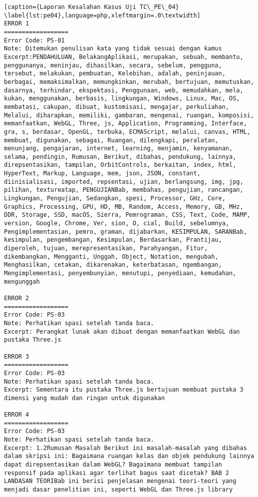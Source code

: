 \begin{enumerate}
\begin{lstlisting}[caption={Laporan Kesalahan Kasus Uji TC\_PE\_04}	\label{lst:pe04},language=php,xleftmargin=.0\textwidth]
ERROR 1
==================
Error Code: PS-01
Note: Ditemukan penulisan kata yang tidak sesuai dengan kamus
Excerpt:PENDAHULUAN, BelakangAplikasi, merupakan, sebuah, membantu, penggunanya, meninjau, dihasilkan, secara, sebelum, pengguna, tersebut, melakukan, pembuatan, Kelebihan, adalah, peninjauan, berbagai, memaksimalkan, memungkinkan, merubah, bertujuan, memutuskan, dasarnya, terhindar, ekspektasi, Penggunaan, web, memudahkan, mela, kukan, menggunakan, berbasis, lingkungan, Windows, Linux, Mac, OS, membatasi, cakupan, dibuat, kustomisasi, mengajar, perkuliahan, Melalui, diharapkan, memiliki, gambaran, mengenai, ruangan, komposisi, memanfaatkan, WebGL, Three, js, Application, Programming, Interface, gra, s, berdasar, OpenGL, terbuka, ECMAScript, melalui, canvas, HTML, membuat, digunakan, sebagai, Ruangan, dilengkapi, peralatan, menunjang, pengajaran, internet, learning, menjamin, kenyamanan, selama, pendingin, Rumusan, Berikut, dibahas, pendukung, lainnya, direpsentasikan, tampilan, OrbitControls, berkaitan, index, html, HyperText, Markup, Language, mem, json, JSON, constant, diinisialisasi, imported, repsentasi, ujian, berlangsung, img, jpg, pilihan, textureatap, PENGUJIANBab, membahas, pengujian, rancangan, Lingkungan, Pengujian, Sedangkan, spesi, Processor, GHz, Core, Graphics, Processing, GPU, HD, MB, Random, Access, Memory, GB, MHz, DDR, Storage, SSD, macOS, Sierra, Pemrograman, CSS, Text, Code, MAMP, version, Google, Chrome, Ver, sion, O, cial, Build, sebelumnya, Pengimplementasian, pemro, graman, dijabarkan, KESIMPULAN, SARANBab, kesimpulan, pengembangan, Kesimpulan, Berdasarkan, Prantijau, diperoleh, tujuan, merepresentasikan, Parahyangan, Fitur, dikembangkan, Mengganti, Unggah, Object, Notation, mengubah, Menghasilkan, cetakan, dikarenakan, keterbatasan, ngembangan, Mengimplementasi, penyembunyian, menutupi, penyediaan, kemudahan, mengunggah

ERROR 2
==================
Error Code: PS-03
Note: Perhatikan spasi setelah tanda baca.
Excerpt: Perangkat lunak akan dibuat dengan memanfaatkan WebGL dan pustaka Three.js

ERROR 3
==================
Error Code: PS-03
Note: Perhatikan spasi setelah tanda baca.
Excerpt: Sementara itu pustaka Three.js bertujuan membuat pustaka 3 dimensi yang mudah dan ringan untuk digunakan

ERROR 4
==================
Error Code: PS-03
Note: Perhatikan spasi setelah tanda baca.
Excerpt: 1.2Rumusan Masalah Berikut ini masalah-masalah yang dibahas dalam skripsi ini: Bagaimana ruangan kelas dan objek pendukung lainnya dapat direpsentasikan dalam WebGL? Bagaimana membuat tampilan responsif pada aplikasi agar terlihat bagus saat dicetak? BAB 2 LANDASAN TEORIBab ini berisi penjelasan mengenai teori-teori yang menjadi dasar penelitian ini, seperti WebGL dan Three.js library


\end{lstlisting}
\end{enumerate}
